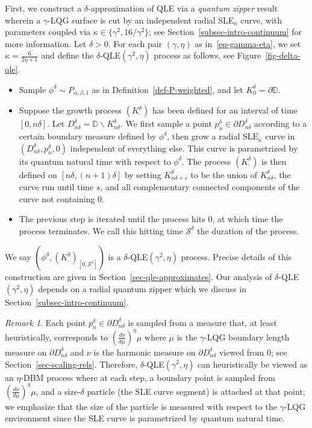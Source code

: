 \documentclass[a4paper]{article}
\numberwithin{equation}{section}
\newcommand{\D}{\mathbb{D}}
\newcommand{\qduration}{\mathcal{S}}
\newcommand{\SLE}{\mathrm{SLE}}
\theoremstyle{remark}
\newtheorem{remark}[theorem]{Remark}
\numberwithin{equation}{section}
\begin{document}
First, we construct a $\delta$-approximation of QLE via a \emph{quantum zipper} result wherein a $\gamma$-LQG surface is cut by an independent radial SLE$_\kappa$ curve, with parameters coupled via $\kappa \in \{ \gamma^2, 16/\gamma^2\}$; see Section~\ref{subsec-intro-continuum} for more information. Let $\delta > 0$. For each pair $(\gamma, \eta)$ as in~\eqref{eq-gamma-eta}, we set $\kappa = \frac{6}{2\eta + 1}$ and define the $\delta$-QLE$(\gamma^2, \eta)$ process as follows, see Figure~\ref{fig-delta-qle}.
\begin{itemize}
    \item Sample $\phi^\delta \sim P_{\alpha, \beta, 1}$ as in Definition~\ref{def-P-weighted}, and let $K_0^\delta = \partial \D$. 
    \item Suppose the growth process $(K^\delta_\cdot)$ has been defined for an interval of time $[0,n \delta]$. Let $D^\delta_{n \delta} = \D \backslash K^\delta_{n\delta}$. We first sample a point $p_n^\delta \in \partial D^\delta_{n\delta}$ according to a certain boundary measure defined by $\phi^\delta$, then grow a radial $\SLE_\kappa$ curve in $(D^\delta_{n\delta}, p_n^\delta, 0)$ independent of everything else. This curve is parametrized by its quantum natural time with respect to $\phi^\delta$. The process $(K^\delta_\cdot)$ is then defined on $[n\delta, (n+1)\delta]$ by setting $K^\delta_{n\delta + s}$ to be the union of $K^\delta_{n\delta}$, the curve run until time $s$, and all complementary connected components of the curve not containing 0. 
    \item The previous step is iterated until the process hits $0$, at which time the process terminates. We call this hitting time $\qduration^\delta$ the duration of the process. 
\end{itemize}
We say $(\phi^\delta, (K^\delta_\cdot)_{[0,\qduration^\delta]})$ is a $\delta$-QLE$(\gamma^2, \eta)$ process. 
Precise details of this construction are given in Section~\ref{sec-qle-approximates}. Our analysis of $\delta$-QLE$(\gamma^2, \eta)$ depends on a radial quantum zipper which we discuss in Section~\ref{subsec-intro-continuum}.

\begin{remark}
Each point $p_n^\delta \in \partial D^\delta_{n\delta}$ is sampled from a measure that, at least heuristically, corresponds to $(\frac{d\nu}{d\mu})^\eta \mu$ where $\mu$ is the $\gamma$-LQG boundary length measure on $\partial D^\delta_{n \delta}$ and $\nu$ is the harmonic measure on $\partial D^\delta_{n \delta}$ viewed from $0$; see Section~\ref{sec-scaling-rels}. Therefore, $\delta$-QLE$(\gamma^2, \eta)$ can heuristically be viewed as an $\eta$-DBM process where at each step, a boundary point is sampled from $(\frac{d\nu}{d\mu})^\eta \mu$, and a size-$\delta$ particle (the SLE curve segment) is attached at that point; we emphasize that the size of the particle is measured with respect to the $\gamma$-LQG environment since the SLE curve is parametrized by quantum natural time. 
\end{remark}
\end{document}
